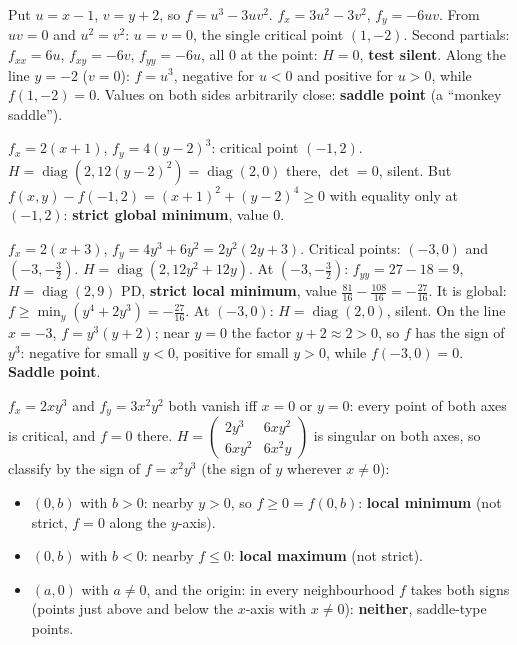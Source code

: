 \begin{solutions}
    \item Put $u = x - 1$, $v = y + 2$, so $f = u^3 - 3 u v^2$. $f_x = 3 u^2 - 3 v^2$, $f_y = -6 u v$. From $u v = 0$ and $u^2 = v^2$: $u = v = 0$, the single critical point $(1, -2)$. Second partials: $f_{xx} = 6 u$, $f_{xy} = -6 v$, $f_{yy} = -6 u$, all $0$ at the point: $H = 0$, \textbf{test silent}. Along the line $y = -2$ ($v = 0$): $f = u^3$, negative for $u < 0$ and positive for $u > 0$, while $f(1, -2) = 0$. Values on both sides arbitrarily close: \textbf{saddle point} (a ``monkey saddle'').
    \item $f_x = 2 (x + 1)$, $f_y = 4 (y - 2)^3$: critical point $(-1, 2)$. $H = \operatorname{diag}(2, 12 (y - 2)^2) = \operatorname{diag}(2, 0)$ there, $\det = 0$, silent. But $f(x, y) - f(-1, 2) = (x + 1)^2 + (y - 2)^4 \geq 0$ with equality only at $(-1, 2)$: \textbf{strict global minimum}, value $0$.
    \item $f_x = 2 (x + 3)$, $f_y = 4 y^3 + 6 y^2 = 2 y^2 (2 y + 3)$. Critical points: $(-3, 0)$ and $(-3, -\tfrac32)$. $H = \operatorname{diag}(2, 12 y^2 + 12 y)$. At $(-3, -\tfrac32)$: $f_{yy} = 27 - 18 = 9$, $H = \operatorname{diag}(2, 9)$ PD, \textbf{strict local minimum}, value $\tfrac{81}{16} - \tfrac{108}{16} = -\tfrac{27}{16}$. It is global: $f \ge \min_y (y^4 + 2 y^3) = -\tfrac{27}{16}$. At $(-3, 0)$: $H = \operatorname{diag}(2, 0)$, silent. On the line $x = -3$, $f = y^3 (y + 2)$; near $y = 0$ the factor $y + 2 \approx 2 > 0$, so $f$ has the sign of $y^3$: negative for small $y < 0$, positive for small $y > 0$, while $f(-3, 0) = 0$. \textbf{Saddle point}.
    \item $f_x = 2 x y^3$ and $f_y = 3 x^2 y^2$ both vanish iff $x = 0$ or $y = 0$: every point of both axes is critical, and $f = 0$ there. $H = \begin{pmatrix} 2 y^3 & 6 x y^2 \\ 6 x y^2 & 6 x^2 y \end{pmatrix}$ is singular on both axes, so classify by the sign of $f = x^2 y^3$ (the sign of $y$ wherever $x \ne 0$):
    \begin{itemize}
        \item $(0, b)$ with $b > 0$: nearby $y > 0$, so $f \ge 0 = f(0, b)$: \textbf{local minimum} (not strict, $f = 0$ along the $y$-axis).
        \item $(0, b)$ with $b < 0$: nearby $f \le 0$: \textbf{local maximum} (not strict).
        \item $(a, 0)$ with $a \ne 0$, and the origin: in every neighbourhood $f$ takes both signs (points just above and below the $x$-axis with $x \neq 0$): \textbf{neither}, saddle-type points.

\end{itemize}
\end{solutions}
